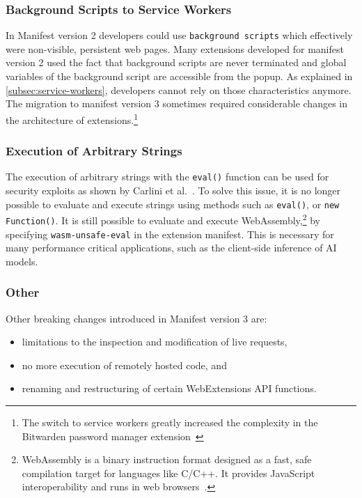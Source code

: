 \subsubsection{Background Scripts to Service Workers}
In Manifest version 2 developers could use \verb|background scripts| which effectively were non-visible, persistent web pages.
Many extensions developed for manifest version 2 used the fact that background scripts are never terminated and global variables of the background script are accessible from the popup.
As explained in \cref{subsec:service-workers}, developers cannot rely on those characteristics anymore.
The migration to manifest version 3 sometimes required considerable changes in the architecture of extensions.\footnote{
The switch to service workers greatly increased the complexity in the Bitwarden password manager extension~\cite{gonzalez2024bitwarden}}

\subsubsection{Execution of Arbitrary Strings}
The execution of arbitrary strings with the \verb|eval()| function can be used for security exploits as shown by Carlini et al.~\cite{carlini2012evaluation}.
To solve this issue, it is no longer possible to evaluate and execute strings using methods such as \verb|eval()|, or \verb|new Function()|.
It is still possible to evaluate and execute WebAssembly,\footnote{WebAssembly is a binary instruction format designed as a fast, safe compilation target for languages like C/C++. It provides JavaScript interoperability and runs in web browsers~\cite{haas2017wasm}.} by specifying \verb|wasm-unsafe-eval| in the extension manifest.
This is necessary for many performance critical applications, such as the client-side inference of AI models.

\subsubsection{Other}
Other breaking changes introduced in Manifest version 3 are:
\begin{itemize}
    \item limitations to the inspection and modification of live requests,
    \item no more execution of remotely hosted code, and
    \item renaming and restructuring of certain WebExtensions API functions.
\end{itemize}

